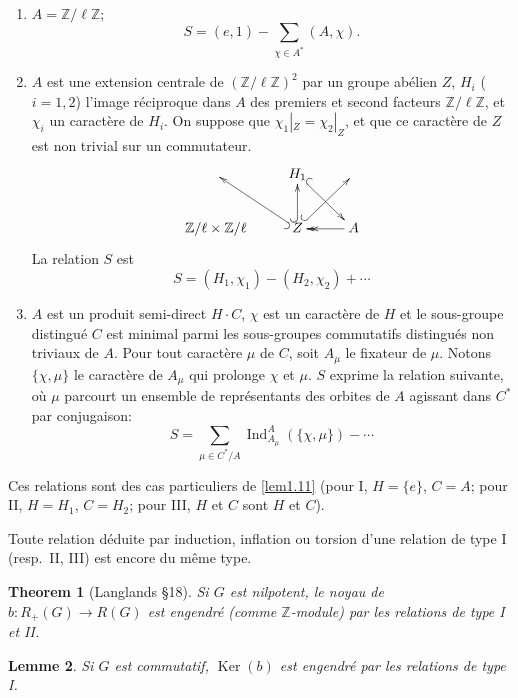 \documentclass[11pt,a4paper]{amsart}
\theoremstyle{plain}
\newtheorem{theorem}{Theorem}[section]
\newtheorem{lemma}[theorem]{Lemme}
\theoremstyle{definition}
\DeclareMathOperator{\Ind}{Ind}
\DeclareMathOperator{\Ker}{Ker}
\newcommand{\dbZ}{\mathbb{Z}}
\newenvironment{para}{\par\noindent}{\par}
\begin{document}
\begin{para}\ \begin{enumerate}
\item[\textbf{I}] $A = \dbZ/\ell\dbZ$;
\[
S = (e,1) - \sum_{\chi \in A^{*}} (A,\chi).
\]
\item[\textbf{II}] $A$ est une extension centrale de $(\dbZ/\ell\dbZ)^{2}$ par un groupe ab\'elien $Z$, $H_{i}$ ($i=1,2$) l'image r\'eciproque dans $A$ des premiers et second facteurs $\dbZ/\ell\dbZ$, et $\chi_{i}$ un caract\`ere de $H_{i}$. On suppose que $\chi_{1}|_{Z} = \chi_{2}|_{Z}$, et que ce caract\`ere de $Z$ est non trivial sur un commutateur.
\[
\xymatrix{
& H_{1} \ar@{^{(}->}[dr] & \\
\dbZ/\ell \times \dbZ/\ell & Z \ar@{^{(}->}[ul] \ar@{^{(}->}[u] \ar@{^{(}->}[ur] & A \ar@{->>}[l]
}
\]
La relation $S$ est
\[
S = (H_{1},\chi_{1}) - (H_{2},\chi_{2}) + \cdots
\]
\item[\textbf{III}] $A$ est un produit semi-direct $H \cdot C$, $\chi$ est un caract\`ere de $H$ et le sous-groupe distingu\'e $C$ est minimal parmi les sous-groupes commutatifs distingu\'es non triviaux de $A$. Pour tout caract\`ere $\mu$ de $C$, soit $A_{\mu}$ le fixateur de $\mu$. Notons $\{\chi,\mu\}$ le caract\`ere de $A_{\mu}$ qui prolonge $\chi$ et $\mu$. $S$ exprime la relation suivante, o\`u $\mu$ parcourt un ensemble de repr\'esentants des orbites de $A$ agissant dans $C^{*}$ par conjugaison:
\[
S = \sum_{\mu \in C^{*}/A} \Ind_{A_{\mu}}^{A}(\{\chi,\mu\}) - \cdots
\]
\end{enumerate}
Ces relations sont des cas particuliers de \ref{lem1.11} (pour I, $H = \{e\}$, $C = A$; pour II, $H = H_{1}$, $C = H_{2}$; pour III, $H$ et $C$ sont $H$ et $C$).
\end{para}

\begin{para}
Toute relation d\'eduite par induction, inflation ou torsion d'une relation de type I (resp.~II, III) est encore du m\^eme type.
\end{para}

\begin{theorem}[Langlands \cite{9} \S18]\label{thm1.13}
Si $G$ est nilpotent, le noyau de $b: R_{+}(G) \to R(G)$ est engendr\'e (comme $\dbZ$-module) par les relations de type \textup{I} et \textup{II}.
\end{theorem}

\begin{lemma}\label{lem1.13.1}
Si $G$ est commutatif, $\Ker(b)$ est engendr\'e par les relations de type \textup{I}.
\end{lemma}
\end{document}
